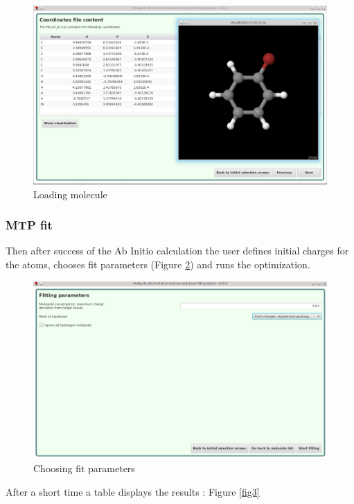 \documentclass[12pt,a4paper]{article}
\begin{document}
\begin{figure}[h!]
\centering
\includegraphics[width=0.9\linewidth]{pics/scr1}
\caption{Loading molecule}
\label{fig1}
\end{figure}

\subsubsection{MTP fit}

Then after success of the Ab Initio calculation the user defines initial charges for the atoms, 
chooses fit parameters (Figure \ref{fig2}) and runs the optimization. \\

\begin{figure}[h!]
\centering
\includegraphics[width=0.9\linewidth]{pics/scr2}
\caption{Choosing fit parameters}
\label{fig2}
\end{figure}

After a short time a table displays the results : Figure \ref{fig3} \\
\end{document}
